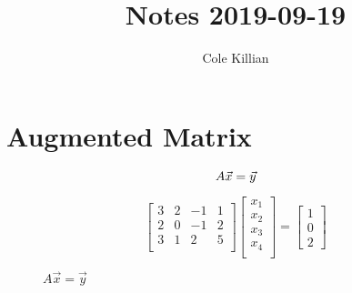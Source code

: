 \documentclass{article}
\begin{document}
\title{Notes 2019-09-19}
\author{Cole Killian}

\maketitle

\section{Augmented Matrix}

$$A \vec{x} = \vec{y}  \\$$

\begin{figure}
\[
\begin{bmatrix}
  3 & 2 & -1 & 1 \\
  2 & 0 & -1 & 2 \\
  3 & 1 & 2 & 5 \\
\end{bmatrix}
\begin{bmatrix}
  x_1  \\
  x_2  \\
  x_3  \\
  x_4  \\
\end{bmatrix}
=
\begin{bmatrix}
  1 \\
  0 \\
  2
\end{bmatrix}
\]
\caption{$A \vec{x} = \vec{y}$}
\end{figure}
\end{document}
